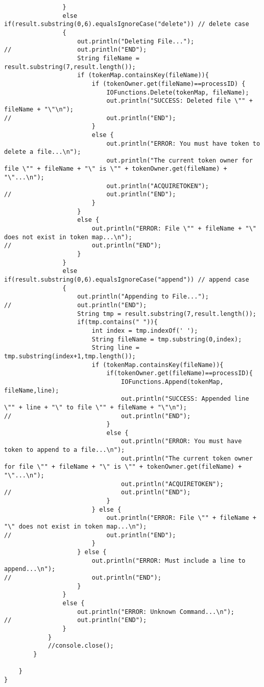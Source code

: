 \documentclass{article}
\begin{document}
\begin{lstlisting}
				}
				else if(result.substring(0,6).equalsIgnoreCase("delete")) // delete case
				{
					out.println("Deleting File...");
//					out.println("END");
					String fileName = result.substring(7,result.length());
					if (tokenMap.containsKey(fileName)){
						if (tokenOwner.get(fileName)==processID) {
							IOFunctions.Delete(tokenMap, fileName);
							out.println("SUCCESS: Deleted file \"" + fileName + "\"\n");
//							out.println("END");
						}
						else {
							out.println("ERROR: You must have token to delete a file...\n");
							out.println("The current token owner for file \"" + fileName + "\" is \"" + tokenOwner.get(fileName) + "\"...\n");
							out.println("ACQUIRETOKEN");
//							out.println("END");
						}
					}
					else {
						out.println("ERROR: File \"" + fileName + "\" does not exist in token map...\n");
//						out.println("END");
					}
				}
				else if(result.substring(0,6).equalsIgnoreCase("append")) // append case
				{
					out.println("Appending to File...");
//					out.println("END");
					String tmp = result.substring(7,result.length());
					if(tmp.contains(" ")){
						int index = tmp.indexOf(' ');
						String fileName = tmp.substring(0,index);
						String line = tmp.substring(index+1,tmp.length());
						if (tokenMap.containsKey(fileName)){
							if(tokenOwner.get(fileName)==processID){
								IOFunctions.Append(tokenMap, fileName,line);
								out.println("SUCCESS: Appended line \"" + line + "\" to file \"" + fileName + "\"\n");
//								out.println("END");
							}
							else {
								out.println("ERROR: You must have token to append to a file...\n");
								out.println("The current token owner for file \"" + fileName + "\" is \"" + tokenOwner.get(fileName) + "\"...\n");
								out.println("ACQUIRETOKEN");
//								out.println("END");
							}
						} else {
							out.println("ERROR: File \"" + fileName + "\" does not exist in token map...\n");
//							out.println("END");
						}
					} else {
						out.println("ERROR: Must include a line to append...\n");
//						out.println("END");
					}
				}
				else {
					out.println("ERROR: Unknown Command...\n");
//					out.println("END");
				}
			}
			//console.close();
		}

	}
}
		\end{lstlisting}
		
\end{document}
